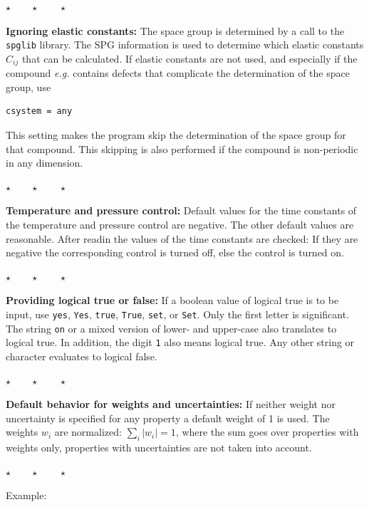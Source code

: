 \documentclass[a4paper,12pt,pdftex,onecolumn]{article}
\newcommand{\eg}{\emph{e.g.}\xspace}
\newcommand{\stars}{\begin{center}%
\vspace{1em plus 0.5em minus 0.5em}%
$\star \qquad \star \qquad \star$%
\vspace{1em plus 0.5em minus 0.5em}%
\end{center}}
\begin{document}
\stars

\textbf{Ignoring elastic constants:}
The space group is determined by a call to the \verb+spglib+ library.
The SPG information is used to determine which elastic constants $C_{ij}$ that can be
calculated. If elastic constants are not used, and especially if the compound \eg
contains defects that complicate the determination of the space group, use

\begin{Verbatim}[fontsize=\relsize{-1},frame=single]
csystem = any
\end{Verbatim}

This setting makes the program skip the determination of the space group for that
compound. This skipping is also performed if the compound is non-periodic in any
dimension.


\stars

\textbf{Temperature and pressure control:}
Default values for the time constants of the temperature and pressure control are negative.
The other default values are reasonable.
After readin the values of the time constants are checked: If they are negative the
corresponding control is turned off, else the control is turned on.


\stars

\textbf{Providing logical true or false:}
If a boolean value of logical true is to be input, use
\verb+yes+, \verb+Yes+, \verb+true+, \verb+True+, \verb+set+, or \verb+Set+.
Only the first letter is significant. The string \verb+on+
or a mixed version of lower- and upper-case also translates to logical true.
In addition, the digit \verb+1+ also means logical true.
Any other string or character evaluates to logical false.

\stars

\textbf{Default behavior for weights and uncertainties:}
If neither weight nor uncertainty is specified for any property a default weight of 1
is used. The weights $w_i$ are normalized: $\sum_i |w_i| = 1$, where the sum goes over
properties with weights only, properties with uncertainties are not taken into account.


\stars

Example:
\end{document}
